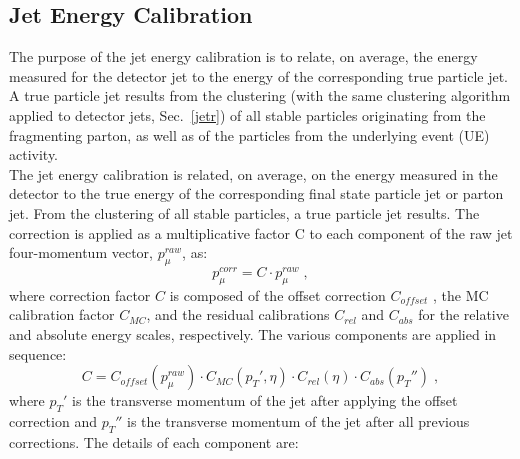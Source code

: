 \subsection*{Jet Energy Calibration}
The purpose of the jet energy calibration is to relate, on average, the energy measured for the
detector jet to the energy of the corresponding true particle jet.  A true particle jet results from
the clustering (with the same clustering algorithm applied to detector jets, Sec.~\ref{jetr}) of all stable particles
originating from the fragmenting parton, as well as of the particles from the underlying event
(UE) activity. \\
The jet energy calibration is related,  on average, on the energy measured in
the detector to the true energy of the corresponding final state particle jet or parton jet.
From the clustering  of all stable particles, a true particle jet results. The correction is applied as
a multiplicative factor C to each component of the raw jet four-momentum vector, $p_{\mu}^{raw}$, as:
\newline
\begin{equation}
p_{\mu}^{corr}=C \cdot p_{\mu}^{raw} \; ,
\end{equation}
where correction factor $C$ is composed of the offset correction $C_{offset}$ , the MC calibration
factor $C_{MC}$, and the residual calibrations $C_{rel}$ and $C_{abs}$ for the relative and absolute
energy scales, respectively. The various components are applied in sequence:
\newline
\begin{equation}
C=   C_{offset} ( p_{\mu}^{raw}) \cdot  C_{MC} (p_T',\eta) \cdot C_{rel}(\eta) \cdot  C_{abs} (p_T'') \; ,
\end{equation}
\newline
where $p_T'$ is the transverse momentum of the jet after applying the offset correction and $p_T''$ is the transverse momentum 
of the jet after all previous corrections. The details of each component are:
